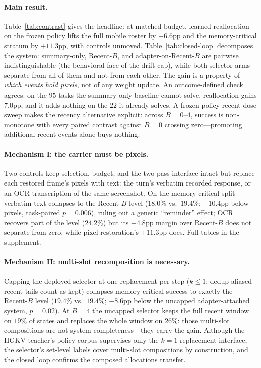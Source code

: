 \documentclass[letterpaper]{article} %
\newcommand{\hgkv}{\textsc{HGKV}}
\begin{document}
\paragraph{Main result.}
Table~\ref{tab:contrast} gives the headline: at matched budget, learned
reallocation on the frozen policy lifts the full mobile roster by
$+6.6$pp and the memory-critical stratum by $+11.3$pp, with controls
unmoved. Table~\ref{tab:closed-loop} decomposes the system: summary-only,
Recent-$B$, and adapter-on-Recent-$B$ are pairwise indistinguishable (the
behavioral face of the drift cap), while both selector arms separate from
all of them and not from each other. The gain is a property of
\emph{which events hold pixels}, not of any weight update. An
outcome-defined check agrees: on the $95$ tasks the summary-only baseline
cannot solve, reallocation gains $7.0$pp, and it adds nothing on the $22$
it already solves. A frozen-policy
recent-dose sweep makes the recency alternative explicit: across
$B{=}0$--$4$, success is non-monotone with every paired contrast against
$B{=}0$ crossing zero---promoting additional recent events alone buys
nothing.

\paragraph{Mechanism I: the carrier must be pixels.}
Two controls keep selection, budget, and the two-pass interface intact
but replace each restored frame's pixels with text: the turn's verbatim
recorded response, or an OCR transcription of the same screenshot. On the
memory-critical split verbatim text collapses to the Recent-$B$ level
($18.0\%$ vs.\ $19.4\%$; $-10.4$pp below pixels, task-paired
$p{=}0.006$), ruling out a generic ``reminder'' effect; OCR recovers part
of the level ($24.2\%$) but its $+4.8$pp margin over Recent-$B$ does not
separate from zero, while pixel restoration's $+11.3$pp does. Full tables
in the supplement.

\paragraph{Mechanism II: multi-slot recomposition is necessary.}
Capping the deployed selector at one replacement per step ($k{\le}1$;
dedup-aliased recent tails count as kept) collapses memory-critical
success to exactly the Recent-$B$ level ($19.4\%$ vs.\ $19.4\%$;
$-8.6$pp below the uncapped adapter-attached system, $p{=}0.02$). At
$B{=}4$ the uncapped selector keeps the full recent window on $19\%$ of
states and replaces the whole window on $26\%$: those multi-slot
compositions are not system completeness---they carry the gain. Although
the \hgkv{} teacher's policy corpus supervises only the $k{=}1$
replacement interface, the selector's set-level labels cover multi-slot
compositions by construction, and the closed loop confirms the composed
allocations transfer.
\end{document}
